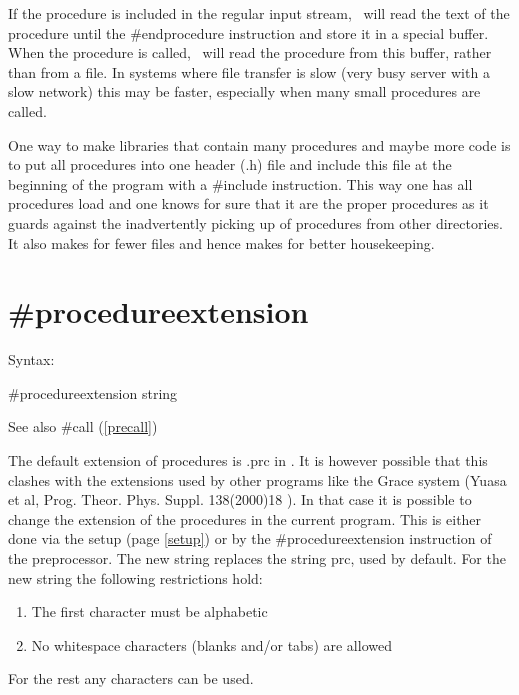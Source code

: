 If the procedure is included in the regular input stream, \FORM\ will read 
the text of the procedure until the \#endprocedure 
instruction and store it in a special buffer. When the procedure is called, 
\FORM\ will read the procedure from this buffer, rather than from a file. In 
systems where file transfer is slow (very busy server with a slow network) 
this may be faster, especially when many small procedures are called.

One way to make libraries that 
contain many procedures and maybe more code is to put all procedures into 
one header (.h) file and include this file at the beginning of the program 
with a \#include instruction. This way one has all 
procedures load and one knows for sure that it are the proper procedures as 
it guards against the inadvertently picking up of procedures from other 
directories. It also makes for fewer files and hence makes for better 
housekeeping.



\section{\#procedureextension}
\label{preprocedureextension}

\noindent Syntax:

\#procedureextension string
 
\noindent See also \#call (\ref{precall})

\noindent The default extension of procedures 
is .prc in \FORM. It is however possible that this clashes with 
the extensions used by other programs like the Grace system 
(Yuasa et al, Prog. Theor. Phys. Suppl. 138(2000)18 ). In that case it is 
possible to change the extension of the procedures in the current program. 
This is either done via the setup (page \ref{setup}) or by the 
\#procedureextension instruction of the preprocessor. The new string 
replaces the string prc, used by default. For the new string the following 
restrictions hold:
\begin{enumerate}
\item The first character must be alphabetic
\item No whitespace characters (blanks and/or tabs) are allowed
\end{enumerate}
For the rest any characters can be used.

